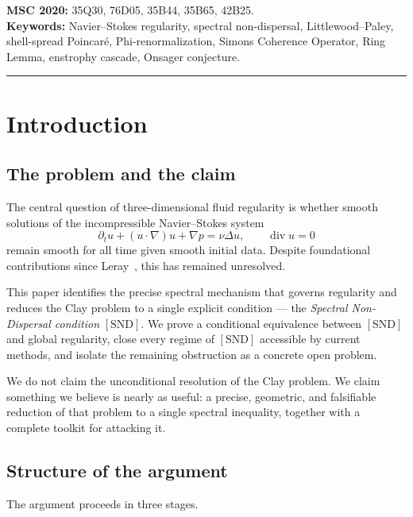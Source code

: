 \documentclass[11pt]{article}
\begin{document}
\noindent\textbf{MSC 2020:} 35Q30, 76D05, 35B44, 35B65, 42B25.\\
\textbf{Keywords:} Navier--Stokes regularity, spectral non-dispersal,
Littlewood--Paley, shell-spread Poincar\'e, Phi-renormalization,
Simons Coherence Operator, Ring Lemma, enstrophy cascade, Onsager conjecture.

\tableofcontents\bigskip\hrule\bigskip

\section{Introduction}

\subsection{The problem and the claim}

The central question of three-dimensional fluid regularity is whether
smooth solutions of the incompressible Navier--Stokes system
\begin{equation}\label{eq:NS}
  \partial_t u + (u\cdot\nabla)u + \nabla p = \nu\Delta u,
  \qquad \operatorname{div}u = 0
\end{equation}
remain smooth for all time given smooth initial data.
Despite foundational contributions since Leray~\cite{Leray1934},
this has remained unresolved.

This paper identifies the precise spectral mechanism that
governs regularity and reduces the Clay problem to a single explicit
condition --- the \emph{Spectral Non-Dispersal condition} $[\mathrm{SND}]$.
We prove a conditional equivalence between $[\mathrm{SND}]$ and global
regularity, close every regime of $[\mathrm{SND}]$ accessible by
current methods, and isolate the remaining obstruction as a
concrete open problem.

We do not claim the unconditional resolution of the Clay problem.
We claim something we believe is nearly as useful: a precise,
geometric, and falsifiable reduction of that problem to a single
spectral inequality, together with a complete toolkit for attacking it.

\subsection{Structure of the argument}

The argument proceeds in three stages.
\end{document}

